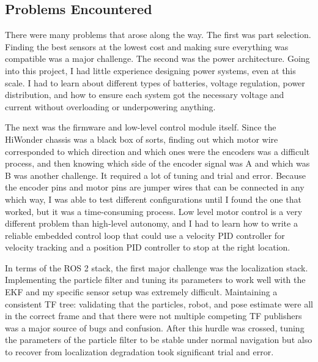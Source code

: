 \documentclass[11pt]{article}
\begin{document}
\subsection{Problems Encountered}
There were many problems that arose along the way. The first was part selection. Finding the best sensors
at the lowest cost
and making sure everything was compatible was a major challenge. The second was the power architecture.
Going into this project,
I had little experience designing power systems, even at this scale. I had to learn about different types
of batteries, voltage regulation,
power distribution, and how to ensure each system got the necessary voltage and current without overloading
or underpowering anything.

The next was the firmware and low-level control module itself. Since the HiWonder chassis was a black box
of sorts, finding out which motor wire
corresponded to which direction and which ones were the encoders was a difficult process, and then
knowing which side of the encoder signal was A and which was B was another challenge.
It required a lot of tuning and trial and error. Because the encoder pins and motor pins are jumper wires
that can be connected in any which way,
I was able to test different configurations until I found the one that worked, but it was a time-consuming
process.
Low level motor control is a very different problem than high-level autonomy, and I had to learn how to
write
a reliable embedded control loop that could use a velocity PID controller for velocity tracking and a
position PID controller to stop at the right location.

In terms of the ROS 2 stack, the first major challenge was the localization stack. Implementing the
particle filter and tuning its parameters to work well with the EKF
and my specific sensor setup was extremely difficult. Maintaining a consistent TF tree: validating that
the particles, robot, and pose estimate were all in the correct frame and that
there were not multiple competing TF publishers was a major source of bugs and confusion. After this hurdle
was crossed, tuning the parameters
of the particle filter to be stable under normal navigation but also to recover from localization
degradation took significant trial and error.
\end{document}
